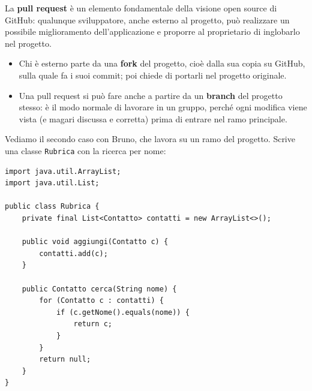 La \textbf{pull request} è un elemento fondamentale della visione open source di GitHub: qualunque sviluppatore, anche
esterno al progetto, può realizzare un possibile miglioramento dell'applicazione e proporre al proprietario di
inglobarlo nel progetto.

\begin{itemize}
  \item Chi è esterno parte da una \textbf{fork} del progetto, cioè dalla sua copia su GitHub, sulla quale fa i suoi
        commit; poi chiede di portarli nel progetto originale.
  \item Una pull request si può fare anche a partire da un \textbf{branch} del progetto stesso: è il modo normale di
        lavorare in un gruppo, perché ogni modifica viene vista (e magari discussa e corretta) prima di entrare nel ramo
        principale.
\end{itemize}

\begin{center}
\end{center}

Vediamo il secondo caso con Bruno, che lavora su un ramo del progetto. Scrive una classe \texttt{Rubrica} con la
ricerca per nome:

\begin{lstlisting}[style=java, name=Rubrica.java]
import java.util.ArrayList;
import java.util.List;

public class Rubrica {
    private final List<Contatto> contatti = new ArrayList<>();

    public void aggiungi(Contatto c) {
        contatti.add(c);
    }

    public Contatto cerca(String nome) {
        for (Contatto c : contatti) {
            if (c.getNome().equals(nome)) {
                return c;
            }
        }
        return null;
    }
}
\end{lstlisting}

